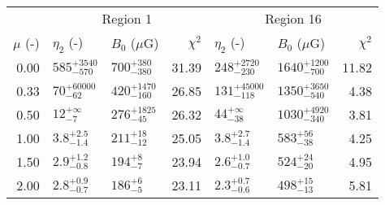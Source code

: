 \begin{tabular}{@{} r llr llr @{}}

\toprule
{} & \multicolumn{3}{c}{Region 1}
   & \multicolumn{3}{c}{Region 16} \\
\cmidrule(lr){2-4} \cmidrule(l){5-7}
$\mu$ (-) & $\eta_2$ (-) & $B_0$ ($\mu$G) & $\chi^2$
          & $\eta_2$ (-) & $B_0$ ($\mu$G) & $\chi^2$ \\
\cmidrule{1-7}
0.00 & ${585}^{+3540}_{-570}$  & ${700}^{+380}_{-380}$   & 31.39
     & ${248}^{+2720}_{-230}$  & ${1640}^{+1200}_{-700}$ & 11.82 \\
0.33 & ${70}^{+60000}_{-62}$   & ${420}^{+1470}_{-160}$  & 26.85
     & ${131}^{+45000}_{-118}$ & ${1350}^{+3650}_{-540}$ & 4.38 \\
0.50 & ${12}^{+\infty}_{-7}$   & ${276}^{+1825}_{-45}$   & 26.32
     & ${44}^{+\infty}_{-38}$  & ${1030}^{+4920}_{-340}$ & 3.81 \\
1.00 & ${3.8}^{+2.5}_{-1.4}$   & ${211}^{+18}_{-12}$     & 25.05
     & ${3.8}^{+2.7}_{-1.4}$   & ${583}^{+56}_{-38}$     & 4.25 \\
1.50 & ${2.9}^{+1.2}_{-0.8}$   & ${194}^{+8}_{-7}$       & 23.94
     & ${2.6}^{+1.0}_{-0.7}$   & ${524}^{+24}_{-20}$     & 4.95 \\
2.00 & ${2.8}^{+0.9}_{-0.7}$   & ${186}^{+6}_{-5}$       & 23.11
     & ${2.3}^{+0.7}_{-0.6}$   & ${498}^{+15}_{-13}$     & 5.81 \\
\bottomrule
\end{tabular}
